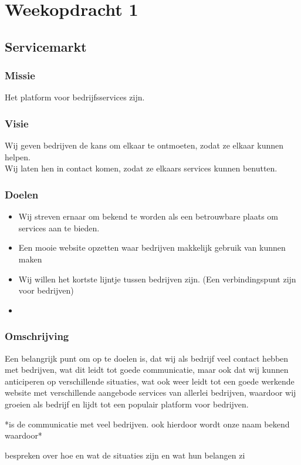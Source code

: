 \chapter{Weekopdracht 1}

\iffalse
Wij verbinden bedrijven
Wij laten bedrijven samenwerken
Community van bedrijven
Wij introduceren bedrijven aan elkaar
Matchmaker voor bedrijfrelaties
Om bedrijven makkelijk met elkaar in contact te brengen voor het delen van services.
door middel van delen van services
\fi

\section{Servicemarkt}

\subsection{Missie}
Het platform voor bedrijfsservices zijn.

\subsection{Visie}
Wij geven bedrijven de kans om elkaar te ontmoeten, zodat ze elkaar kunnen helpen. \\
Wij laten hen in contact komen, zodat ze elkaars services kunnen benutten.

\subsection{Doelen}

\begin{itemize}
\item
  Wij streven ernaar om bekend te worden als een betrouwbare plaats om services aan te bieden.
\item
  Een mooie website opzetten waar bedrijven makkelijk gebruik van kunnen maken
\item
  Wij willen het kortste lijntje tussen bedrijven zijn. (Een verbindingspunt zijn voor bedrijven)
\item
  
\end{itemize}

\subsection{Omschrijving}
Een belangrijk punt om op te doelen is, dat wij als bedrijf veel contact hebben met bedrijven, wat dit leidt tot goede communicatie, 
maar ook dat wij kunnen anticiperen op verschillende situaties, wat ook weer leidt tot een goede werkende website met verschillende aangebode services van allerlei bedrijven, 
waardoor wij groeien als bedrijf en lijdt tot een populair platform voor bedrijven.

*is de communicatie met veel bedrijven. ook hierdoor wordt onze naam bekend waardoor*


bespreken over hoe en wat de situaties zijn en wat hun belangen zi

